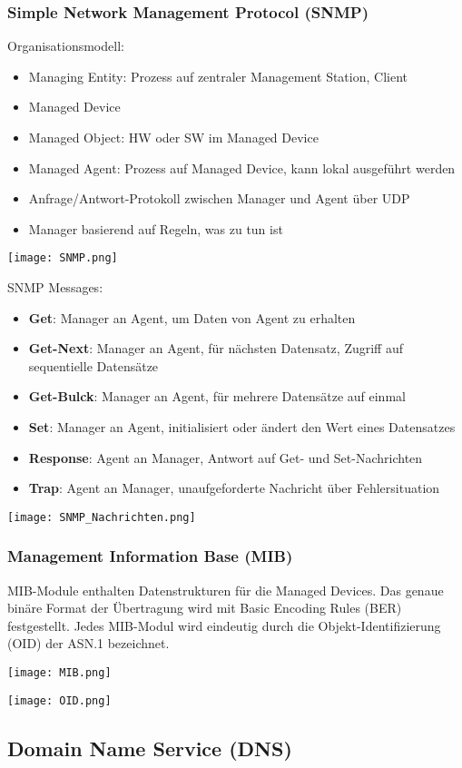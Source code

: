 		\subsubsection{Simple Network Management Protocol (SNMP)}
			Organisationsmodell: 
			\begin{itemize}
				\item Managing Entity: Prozess auf zentraler Management Station, Client
				\item Managed Device
				\item Managed Object: HW oder SW im Managed Device
				\item Managed Agent: Prozess auf Managed Device, kann lokal ausgeführt werden
				\item Anfrage/Antwort-Protokoll zwischen Manager und Agent über UDP
				\item Manager basierend auf Regeln, was zu tun ist
			\end{itemize}
			\begin{center}
				\texttt{[image: SNMP.png]}
			\end{center}
			SNMP Messages:
			\begin{itemize}
				\item \textbf{Get}: Manager an Agent, um Daten von Agent zu erhalten
				\item \textbf{Get-Next}: Manager an Agent, für nächsten Datensatz, Zugriff auf sequentielle Datensätze
				\item \textbf{Get-Bulck}: Manager an Agent, für mehrere Datensätze auf einmal
				\item \textbf{Set}: Manager an Agent, initialisiert oder ändert den Wert eines Datensatzes 
				\item \textbf{Response}: Agent an Manager, Antwort auf Get- und Set-Nachrichten
				\item \textbf{Trap}: Agent an Manager, unaufgeforderte Nachricht über Fehlersituation
			\end{itemize}
			\begin{center}
				\texttt{[image: SNMP\_Nachrichten.png]}
			\end{center}
		\subsubsection{Management Information Base (MIB)}
			MIB-Module enthalten Datenstrukturen für die Managed Devices. Das genaue binäre Format der Übertragung wird mit Basic Encoding Rules (BER) festgestellt. Jedes MIB-Modul wird eindeutig durch die Objekt-Identifizierung (OID) der ASN.1 bezeichnet.
			\begin{center}
				\texttt{[image: MIB.png]}
			\end{center}
			\begin{center}
				\texttt{[image: OID.png]}
			\end{center}
	\subsection{Domain Name Service (DNS)}
		


			
			
			
